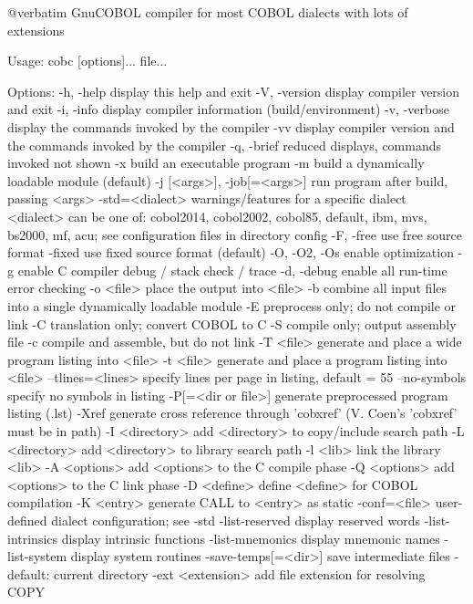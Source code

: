 @verbatim
GnuCOBOL compiler for most COBOL dialects with lots of extensions

Usage: cobc [options]... file...

Options:
  -h, -help             display this help and exit
  -V, -version          display compiler version and exit
  -i, -info             display compiler information (build/environment)
  -v, -verbose          display the commands invoked by the compiler
  -vv                   display compiler version and the commands
                        invoked by the compiler
  -q, -brief            reduced displays, commands invoked not shown
  -x                    build an executable program
  -m                    build a dynamically loadable module (default)
  -j [<args>], -job[=<args>]	run program after build, passing <args>
  -std=<dialect>        warnings/features for a specific dialect
                        <dialect> can be one of:
                        cobol2014, cobol2002, cobol85, default,
                        ibm, mvs, bs2000, mf, acu;
                        see configuration files in directory config
  -F, -free             use free source format
  -fixed                use fixed source format (default)
  -O, -O2, -Os          enable optimization
  -g                    enable C compiler debug / stack check / trace
  -d, -debug            enable all run-time error checking
  -o <file>             place the output into <file>
  -b                    combine all input files into a single
                        dynamically loadable module
  -E                    preprocess only; do not compile or link
  -C                    translation only; convert COBOL to C
  -S                    compile only; output assembly file
  -c                    compile and assemble, but do not link
  -T <file>             generate and place a wide program listing into <file>
  -t <file>             generate and place a program listing into <file>
  --tlines=<lines>      specify lines per page in listing, default = 55
  --no-symbols          specify no symbols in listing
  -P[=<dir or file>]    generate preprocessed program listing (.lst)
  -Xref                 generate cross reference through 'cobxref'
                        (V. Coen's 'cobxref' must be in path)
  -I <directory>        add <directory> to copy/include search path
  -L <directory>        add <directory> to library search path
  -l <lib>              link the library <lib>
  -A <options>          add <options> to the C compile phase
  -Q <options>          add <options> to the C link phase
  -D <define>           define <define> for COBOL compilation
  -K <entry>            generate CALL to <entry> as static
  -conf=<file>          user-defined dialect configuration; see -std
  -list-reserved        display reserved words
  -list-intrinsics      display intrinsic functions
  -list-mnemonics       display mnemonic names
  -list-system          display system routines
  -save-temps[=<dir>]   save intermediate files
                        - default: current directory
  -ext <extension>      add file extension for resolving COPY

